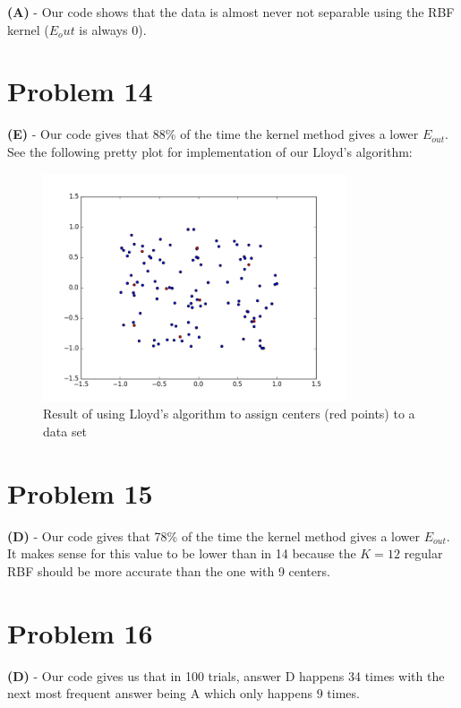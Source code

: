 \documentclass[10pt,letter]{article}
\begin{document}
\textbf{(A)} - Our code shows that the data is almost never not separable using the RBF kernel ($E_out$ is always 0).

\section*{Problem 14}

\textbf{(E)} - Our code gives that 88\% of the time the kernel method gives a lower $E_{out}$. See the following pretty plot for implementation of our Lloyd's algorithm:

\begin{figure}[H]
\begin{center}
\includegraphics[width=0.8\textwidth]{lloyds_alg.png}
\caption{Result of using Lloyd's algorithm to assign centers (red points) to a data set}
\end{center}
\end{figure}

\section*{Problem 15}

\textbf{(D)} - Our code gives that 78\% of the time the kernel method gives a lower $E_{out}$. It makes sense for this value to be lower than in 14 because the $K = 12$ regular RBF should be more accurate than the one with 9 centers.

\section*{Problem 16}

\textbf{(D)} - Our code gives us that in 100 trials, answer D happens 34 times with the next most frequent answer being A which only happens 9 times.
\end{document}
